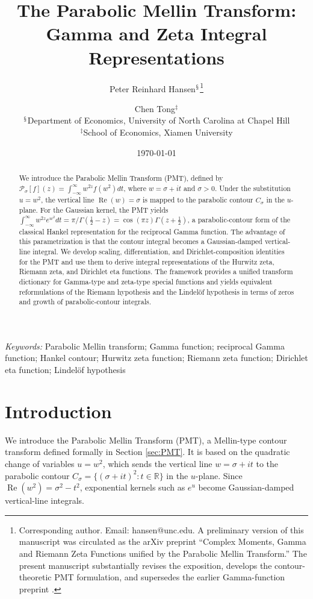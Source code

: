 \documentclass[12pt,english]{article}
\title{The Parabolic Mellin Transform: Gamma and Zeta Integral Representations}
\author{Peter Reinhard Hansen$^{\mathsection}$\thanks{Corresponding author. Email: hansen@unc.edu. A preliminary version of this manuscript was circulated as the arXiv preprint ``Complex Moments, Gamma and Riemann Zeta Functions unified by the Parabolic Mellin Transform.'' The present manuscript substantially revises the exposition, develops the contour-theoretic PMT formulation, and supersedes the earlier Gamma-function preprint \cite{HansenTong:2025ReciprocalGamma}.} \and Chen Tong$^{\ddagger}$
\\ \small $^{\mathsection}$Department of Economics, University of North Carolina at Chapel Hill
\\[-0.2cm] \small $^{\ddagger}$School of Economics, Xiamen University}
\date{\today}
\theoremstyle{plain} %
\theoremstyle{remark} %
\begin{document}
\maketitle

\begin{abstract}
We introduce the Parabolic Mellin Transform (PMT), defined by $\mathcal{P}_{\sigma}[f](z)=\int_{-\infty}^{\infty}w^{2z}f(w^2)dt$, where $w=\sigma+it$ and $\sigma>0$. Under the substitution $u=w^2$, the vertical line $\operatorname{Re}(w)=\sigma$ is mapped to the parabolic contour $C_\sigma$ in the $u$-plane. For the Gaussian kernel, the PMT yields $\int_{-\infty}^{\infty}w^{2z}e^{w^2}dt=\pi/\Gamma(\tfrac{1}{2}-z)=\cos(\pi z)\Gamma(z+\tfrac{1}{2})$, a parabolic-contour form of the classical Hankel representation for the reciprocal Gamma function. The advantage of this parametrization is that the contour integral becomes a Gaussian-damped vertical-line integral. 
We develop scaling, differentiation, and Dirichlet-composition identities for the PMT and use them to derive integral representations of the Hurwitz zeta, Riemann zeta, and Dirichlet eta functions. The framework provides a unified transform dictionary for Gamma-type and zeta-type special functions and yields equivalent reformulations of the Riemann hypothesis and the Lindel\"of hypothesis in terms of zeros and growth of parabolic-contour integrals.
\end{abstract}

\noindent%
{\it Keywords:} Parabolic Mellin transform; Gamma function; reciprocal Gamma function; Hankel contour; Hurwitz zeta function; Riemann zeta function; Dirichlet eta function; Lindel\"of hypothesis


\setlength{\abovedisplayskip}{8pt}
\setlength{\belowdisplayskip}{8pt}
\setlength{\abovedisplayshortskip}{5pt}
\setlength{\belowdisplayshortskip}{5pt}
\newpage{}
\section{Introduction}

We introduce the Parabolic Mellin Transform (PMT), a Mellin-type contour transform defined formally in Section \ref{sec:PMT}. It is based on the quadratic change of variables $u=w^2$, which sends the vertical line $w=\sigma+it$ to the parabolic contour $C_\sigma=\{(\sigma+it)^2:t\in\mathbb{R}\}$ in the $u$-plane. Since $\operatorname{Re}(w^2)=\sigma^2-t^2$, exponential kernels such as $e^u$ become Gaussian-damped vertical-line integrals.
\end{document}

